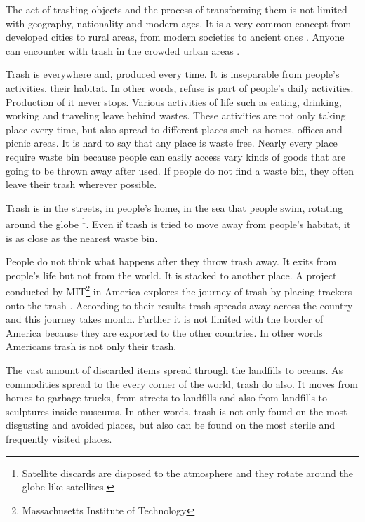The act of trashing objects and the process of transforming them is not limited with geography, nationality and modern ages. It is a very common concept from developed cities to rural areas, from modern societies to ancient ones \citep[33]{rathje1992rubbish}. Anyone can encounter with trash in the crowded urban areas  \citep[16]{cerny1996recycled}.

Trash is everywhere and, produced every time. It is inseparable from people's activities.  \citep[xxv]{zimring2012encyclopedia} their habitat. In other words, refuse is part of people's daily activities. Production of it never stops. Various activities of life such as eating, drinking, working and traveling leave behind wastes. These activities are not only taking place every time, but also spread to different places such as homes, offices and picnic areas. It is hard to say that any place is waste free. Nearly every place require waste bin because people can easily access vary kinds of goods that are going to be thrown away after used. If people do not find a waste bin, they often leave their trash wherever possible.

Trash is in the streets, in people's home, in the sea that people swim, rotating around the globe \footnote{Satellite discards are disposed to the atmosphere and they rotate around the globe like satellites.}. Even if trash is tried to move away from people's habitat, it is as close as the nearest waste bin.

People do not think what happens after they throw trash away.  It exits from people's life but not from the world. It is stacked to another place. A project conducted by MIT\footnote{Massachusetts Institute of Technology} in America explores the journey of trash by placing trackers onto the trash \citep{chen2009mit}. According to their results trash spreads away across the country and this journey takes month. Further it is not limited with the border of America because they are exported to the other countries. In other words Americans trash is not only their trash.

The vast amount of discarded items spread through the landfills to oceans. As commodities spread to the every corner of the world, trash do also. It moves from homes to garbage trucks, from streets to landfills and also from landfills to sculptures inside museums. In other words, trash is not only found on the most disgusting and avoided places, but also can be found on the most sterile and frequently visited places.

